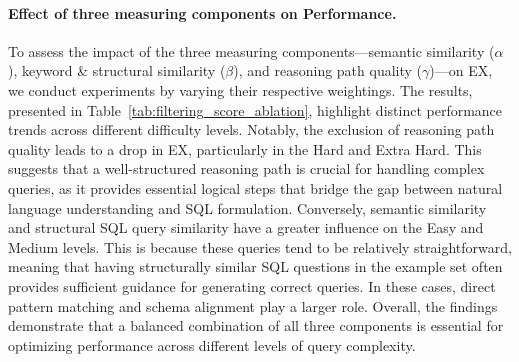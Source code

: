 

 

\paragraph{Effect of three measuring components on Performance.}

To assess the impact of the three measuring components—semantic similarity ($\alpha$), keyword \& structural similarity ($\beta$), and reasoning path quality ($\gamma$)—on EX, we conduct experiments by varying their respective weightings. The results, presented in Table~\ref{tab:filtering_score_ablation}, highlight distinct performance trends across different difficulty levels. Notably, the exclusion of reasoning path quality leads to a drop in EX, particularly in the Hard and Extra Hard. This suggests that a well-structured reasoning path is crucial for handling complex queries, as it provides essential logical steps that bridge the gap between natural language understanding and SQL formulation. Conversely, semantic similarity and structural SQL query similarity have a greater influence on the Easy and Medium levels. This is because these queries tend to be relatively straightforward, meaning that having structurally similar SQL questions in the example set often provides sufficient guidance for generating correct queries. In these cases, direct pattern matching and schema alignment play a larger role. Overall, the findings demonstrate that a balanced combination of all three components is essential for optimizing performance across different levels of query complexity.





